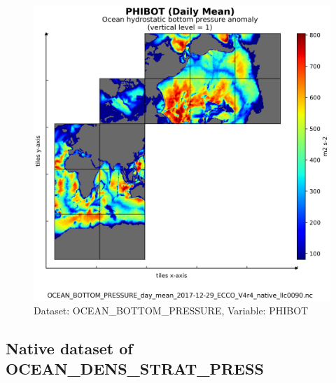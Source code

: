 \begin{figure}[H]
\centering
\includegraphics[scale=0.55]{../images/plots/v4r4/native_plots/Ocean_Bottom_Pressure/PHIBOT.png}
\caption{Dataset: OCEAN\_BOTTOM\_PRESSURE, Variable: PHIBOT}
\label{tab:table-OCEAN_BOTTOM_PRESSURE_PHIBOT-Plot}
\end{figure}
\newpage
\subsection{Native dataset of OCEAN\_DENS\_STRAT\_PRESS}
\newp
